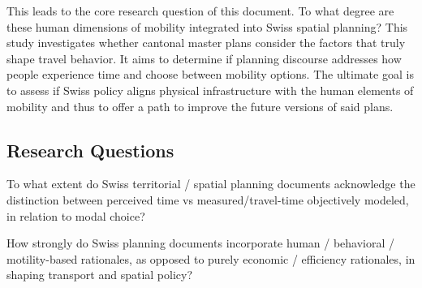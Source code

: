 This leads to the core research question of this document. To what degree are these human dimensions of mobility integrated into Swiss spatial planning? This study investigates whether cantonal master plans consider the factors that truly shape travel behavior. It aims to determine if planning discourse addresses how people experience time and choose between mobility options. The ultimate goal is to assess if Swiss policy aligns physical infrastructure with the human elements of mobility and thus to offer a path to improve the future versions of said plans.
\subsection{Research Questions}

To what extent do Swiss territorial / spatial planning documents acknowledge the distinction between perceived time vs measured/travel-time objectively modeled, in relation to modal choice?

How strongly do Swiss planning documents incorporate human / behavioral / motility-based rationales, as opposed to purely economic / efficiency rationales, in shaping transport and spatial policy?
